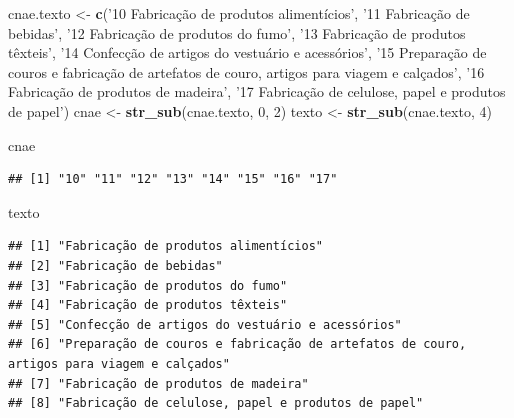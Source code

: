 \documentclass[]{book}
\newenvironment{Shaded}{\begin{snugshade}}{\end{snugshade}}
\newcommand{\KeywordTok}[1]{\textcolor[rgb]{0.13,0.29,0.53}{\textbf{#1}}}
\newcommand{\DecValTok}[1]{\textcolor[rgb]{0.00,0.00,0.81}{#1}}
\newcommand{\StringTok}[1]{\textcolor[rgb]{0.31,0.60,0.02}{#1}}
\newcommand{\NormalTok}[1]{#1}
\begin{document}
\begin{Shaded}
\begin{Highlighting}[]
\NormalTok{cnae.texto <-}\StringTok{ }\KeywordTok{c}\NormalTok{(}\StringTok{'10 Fabricação de produtos alimentícios'}\NormalTok{, }\StringTok{'11 Fabricação de bebidas'}\NormalTok{, }
             \StringTok{'12 Fabricação de produtos do fumo'}\NormalTok{, }\StringTok{'13 Fabricação de produtos têxteis', }
\StringTok{             '}\DecValTok{14}\NormalTok{ Confecção de artigos do vestuário e acessórios',}
             \StringTok{'15 Preparação de couros e fabricação de artefatos de couro, artigos para viagem e calçados'}\NormalTok{,}
             \StringTok{'16 Fabricação de produtos de madeira'}\NormalTok{, }
             \StringTok{'17 Fabricação de celulose, papel e produtos de papel'}\NormalTok{)}
\NormalTok{cnae <-}\StringTok{ }\KeywordTok{str_sub}\NormalTok{(cnae.texto, }\DecValTok{0}\NormalTok{, }\DecValTok{2}\NormalTok{)}
\NormalTok{texto <-}\StringTok{ }\KeywordTok{str_sub}\NormalTok{(cnae.texto, }\DecValTok{4}\NormalTok{)}

\NormalTok{cnae}
\end{Highlighting}
\end{Shaded}

\begin{verbatim}
## [1] "10" "11" "12" "13" "14" "15" "16" "17"
\end{verbatim}

\begin{Shaded}
\begin{Highlighting}[]
\NormalTok{texto}
\end{Highlighting}
\end{Shaded}

\begin{verbatim}
## [1] "Fabricação de produtos alimentícios"                                                    
## [2] "Fabricação de bebidas"                                                                  
## [3] "Fabricação de produtos do fumo"                                                         
## [4] "Fabricação de produtos têxteis"                                                         
## [5] "Confecção de artigos do vestuário e acessórios"                                         
## [6] "Preparação de couros e fabricação de artefatos de couro, artigos para viagem e calçados"
## [7] "Fabricação de produtos de madeira"                                                      
## [8] "Fabricação de celulose, papel e produtos de papel"
\end{verbatim}
\end{document}
